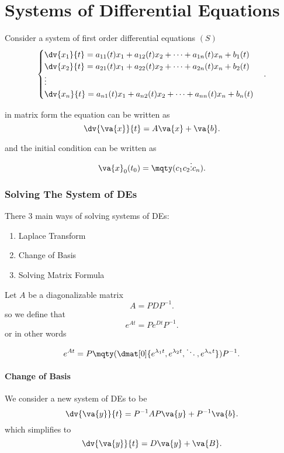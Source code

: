 \part{Systems of Differential Equations}

Consider a system of first order differential equations $(S)$
\[
	\begin{cases}
		\dv{x_1}{t} = a_{11}(t)x_1+a_{12}(t)x_2+\cdots+a_{1n}(t)x_n + b_1(t) \\
		\dv{x_2}{t} = a_{21}(t)x_1+a_{22}(t)x_2+\cdots+a_{2n}(t)x_n + b_2(t) \\
		\vdots                                                               \\
		\dv{x_n}{t} = a_{n1}(t)x_1+a_{n2}(t)x_2+\cdots+a_{nn}(t)x_n + b_n(t) \\
	\end{cases}
	.\]

in matrix form the equation can be written as
\[
	\dv{\va{x}}{t} = A\va{x} + \va{b}
	.\]

and the initial condition can be written as
\[
	\va{x}_0(t_0) = \mqty(c_1\\c_2\\\vdots\\c_n)
	.\]

\section{Solving The System of DEs}
There 3 main ways of solving systems of DEs:
\begin{enumerate}
	\item Laplace Transform
	\item Change of Basis
	\item Solving Matrix Formula
\end{enumerate}

\begin{remark}
	Let $A$ be a diagonalizable matrix
	\[
		A=PDP^{-1}
		.\]
	so we define that
	\[
		e^{At}=Pe^{Dt}P^{-1}
		.\]
	or in other words
	\[
		e^{At}=P\mqty(\dmat[0]{e^{\lambda_1t},e^{\lambda_2t},\ddots,e^{\lambda_nt}})P^{-1}
		.\]
\end{remark}

\subsection{Change of Basis}

We consider a new system of DEs to be
\[
	\dv{\va{y}}{t} = P^{-1}AP\va{y}+ P^{-1}\va{b}
	.\]
which simplifies to
\[
	\dv{\va{y}}{t} = D\va{y}+ \va{B}
	.\]

